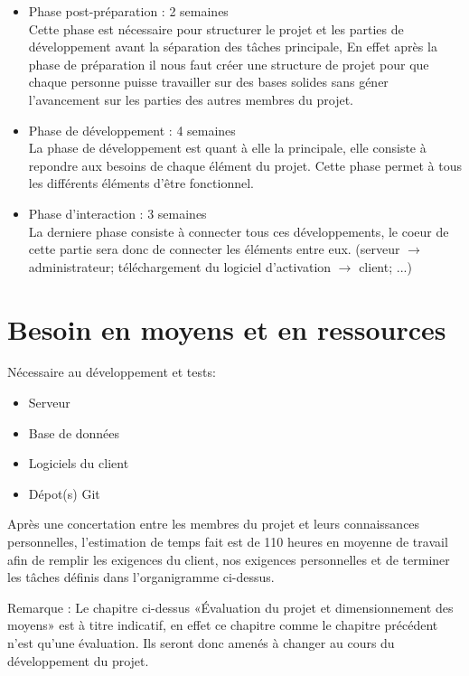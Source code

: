 \begin{itemize}
	\item Phase post-préparation : 2 semaines\\ 
	    Cette phase est nécessaire pour structurer le projet et les parties de développement avant
        la séparation des tâches principale, En effet après la phase de préparation il nous faut
        créer une structure de projet pour que chaque personne puisse travailler sur des bases
        solides sans géner l'avancement sur les parties des autres membres du projet. \newline
	\item Phase de développement : 4 semaines\\
	    La phase de développement est quant à elle la principale, elle consiste à repondre aux
        besoins de chaque élément du projet. Cette phase permet à tous les différents éléments
        d'être fonctionnel.
	\item Phase d'interaction : 3 semaines\\
	    La derniere phase consiste à connecter tous ces développements, le coeur de cette partie
        sera donc de connecter les éléments entre eux. (serveur $\rightarrow$ administrateur;
        téléchargement du logiciel d'activation $\rightarrow$ client; ...)
\end{itemize}
\newpage

\section{Besoin en moyens et en ressources}
Nécessaire au développement et tests:
\begin{itemize}
	\item Serveur
	\item Base de données
	\item Logiciels du client
	\item Dépot(s) Git\newline
\end{itemize}
\medskip

Après une concertation entre les membres du projet et leurs connaissances personnelles,
l'estimation de temps fait est de 110 heures en moyenne de travail afin de remplir les exigences
du client, nos exigences personnelles et de terminer les tâches définis	dans l'organigramme
ci-dessus.\newline
\medskip

Remarque : Le chapitre ci-dessus «Évaluation du projet et dimensionnement des moyens» est à titre
indicatif, en effet ce chapitre comme le chapitre précédent n'est qu'une évaluation. Ils seront
donc amenés à changer au cours du développement du projet.

